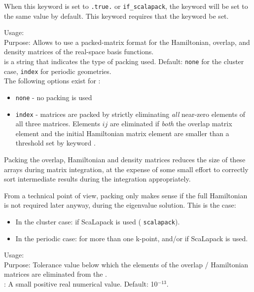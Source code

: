 When this keyword is set to \texttt{.true.} or \texttt{if\_scalapack}, the
 keyword will be set to the same value by default.
This keyword requires that the  keyword be set.

{
  \noindent
  Usage:   \\[1.0ex]
  Purpose: Allows to use a packed-matrix format for the Hamiltonian,
    overlap, and density matrices of the real-space basis functions. \\[1.0ex]  
   is a string that indicates the type of packing
    used. Default: \texttt{none} for the cluster case, \texttt{index}
    for periodic geometries. \\
}
The following options exist for :
\begin{itemize}
  \item \texttt{none} - no packing is used
  \item \texttt{index} - matrices are packed by
    strictly eliminating \emph{all} near-zero elements of all three 
    matrices. Elements $ij$ are eliminated if \emph{both} the overlap
    matrix element and the initial Hamiltonian matrix element are
    smaller than a threshold set by keyword .
\end{itemize}
Packing the overlap, Hamiltonian and density matrices reduces the size
of these arrays during matrix integration, at the expense of some
small effort to correctly sort intermediate results during the
integration appropriately. 

From a technical point of view,
packing only makes sense if the full Hamiltonian is not required later
anyway, during the eigenvalue solution. This is the case:
\begin{itemize}
  \item In the cluster case: if ScaLapack is used
    ( \texttt{scalapack}).
  \item In the periodic case: for more than one k-point, and/or if
    ScaLapack is used. 
\end{itemize}

{
  \noindent
  Usage:   \\[1.0ex]
  Purpose: Tolerance value below which the elements of the overlap /
    Hamiltonian matrices are eliminated from the
    . \\[1.0ex] 
   : A small positive real numerical value. Default:
    10$^{-13}$. 
}

